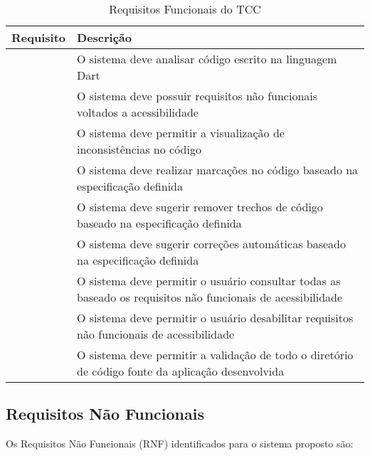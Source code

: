 \begin{table}[!htbp]
	\centering
	\renewcommand{\arraystretch}{1.1}
	\caption{Requisitos Funcionais do TCC}
	\label{tab:tabela-requisitos-funcionais}
	\begin{tabular}{ L{2cm}  L{12cm} }
		\hline
		Requisito & Descrição \\
		\hline
		\therf	& O sistema deve analisar código escrito na linguagem Dart \\
    \therf	& O sistema deve possuir requisitos não funcionais voltados a acessibilidade \\
    \therf	& O sistema deve permitir a visualização de inconsistências no código \\
    \therf	& O sistema deve realizar marcações no código baseado na especificação definida \\
    \therf	& O sistema deve sugerir remover trechos de código baseado na especificação definida \\
    \therf	& O sistema deve sugerir correções automáticas baseado na especificação definida \\
    \therf	& O sistema deve permitir o usuário consultar todas as baseado os requisitos não funcionais de acessibilidade \\
    \therf	& O sistema deve permitir o usuário desabilitar requisitos não funcionais de acessibilidade \\
    \therf	& O sistema deve permitir a validação de todo o diretório de
    código fonte da aplicação desenvolvida \\
		\hline
	\end{tabular}
	\vspace{2mm}
\end{table}

\pagebreak

\subsection{Requisitos Não Funcionais}

Os Requisitos Não Funcionais (RNF) identificados para o sistema proposto são:

\renewcommand{\thernf}{RNF\arabic{rnf}}


